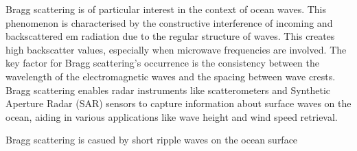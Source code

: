 Bragg scattering is of particular interest in the context of ocean waves. This phenomenon is characterised by the constructive interference of incoming and backscattered \acs{em} radiation due to the regular structure of waves. This creates high backscatter values, especially when microwave frequencies are involved. The key factor for Bragg scattering's occurrence is the consistency between the wavelength of the electromagnetic waves and the spacing between wave crests. Bragg scattering enables radar instruments like scatterometers and Synthetic Aperture Radar (SAR) sensors to capture information about surface waves on the ocean, aiding in various applications like wave height and wind speed retrieval.

Bragg scattering is casued by short ripple waves on the ocean surface \cite{Hasselmann1991}

